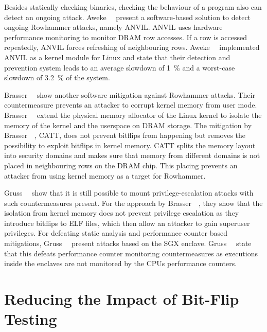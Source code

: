 Besides statically checking binaries, checking the behaviour of a program also
can detect an ongoing attack. Aweke~\etal~\cite{anvil} present a software-based
solution to detect ongoing Rowhammer attacks, namely ANVIL. ANVIL uses hardware
performance monitoring to monitor DRAM row accesses. If a row is accessed
repeatedly, ANVIL forces refreshing of neighbouring rows.
Aweke~\etal~\cite{anvil} implemented ANVIL as a kernel module for Linux and
state that their detection and prevention system leads to an average slowdown of
\SI{1}{\percent} and a worst-case slowdown of \SI{3.2}{\percent} of the system.

Brasser~\etal~\cite{canttouch} show another software mitigation against
Rowhammer attacks. Their countermeasure prevents an attacker to corrupt kernel
memory from user mode. Brasser~\etal~\cite{canttouch} extend the physical memory
allocator of the Linux kernel to isolate the memory of the kernel and the
userspace on DRAM storage. The mitigation by Brasser~\etal~\cite{canttouch},
CATT, does not prevent bitflips from happening but removes the possibility to
exploit bitflips in kernel memory. CATT splits the memory layout into security
domains and makes sure that memory from different domains is not placed in
neighbouring rows on the DRAM chip. This placing prevents an attacker from using
kernel memory as a target for Rowhammer.

Gruss~\etal~\cite{flipinthewall} show that it is still possible to mount
privilege-escalation attacks with such countermeasures present. For the approach
by Brasser~\etal~\cite{canttouch}, they show that the isolation from kernel
memory does not prevent privilege escalation as they introduce bitflips to ELF
files, which then allow an attacker to gain superuser privileges. For defeating
static analysis and performance counter based mitigations,
Gruss~\etal~\cite{flipinthewall} present attacks based on the SGX enclave.
Gruss~\etal~\cite{flipinthewall} state that this defeats performance counter
monitoring countermeasures as executions inside the enclaves are not monitored
by the CPU\textquotesingle s performance counters.

\section{Reducing the Impact of Bit-Flip Testing}

